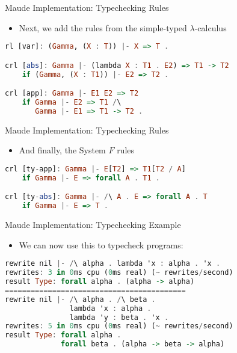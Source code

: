 \documentclass[leqno,presentation,usenames,dvipsnames]{beamer}
\begin{document}
\begin{frame}[fragile]{Maude Implementation: Typechecking Rules}
    \begin{itemize}
        \item Next, we add the rules from the simple-typed $\lambda$-calculus
    \end{itemize}

\begin{lstlisting}[language=haskell, basicstyle=\small\ttfamily]
rl [var]: (Gamma, (X : T)) |- X => T .

crl [abs]: Gamma |- (lambda X : T1 . E2) => T1 -> T2
    if (Gamma, (X : T1)) |- E2 => T2 .

crl [app]: Gamma |- E1 E2 => T2
    if Gamma |- E2 => T1 /\
       Gamma |- E1 => T1 -> T2 .
\end{lstlisting}
\end{frame}

\begin{frame}[fragile]{Maude Implementation: Typechecking Rules}
    \begin{itemize}
        \item And finally, the System $F$ rules
    \end{itemize}

\begin{lstlisting}[language=haskell, basicstyle=\small\ttfamily]
crl [ty-app]: Gamma |- E[T2] => T1[T2 / A]
    if Gamma |- E => forall A . T1 .

crl [ty-abs]: Gamma |- /\ A . E => forall A . T
    if Gamma |- E => T .
\end{lstlisting}
\end{frame}

\begin{frame}[fragile]{Maude Implementation: Typechecking Example}
    \begin{itemize}
        \item We can now use this to typecheck programs:
    \end{itemize}

\footnotesize
\begin{lstlisting}[language=haskell, basicstyle=\small\ttfamily]
rewrite nil |- /\ alpha . lambda 'x : alpha . 'x .
rewrites: 3 in 0ms cpu (0ms real) (~ rewrites/second)
result Type: forall alpha . (alpha -> alpha)
==========================================
rewrite nil |- /\ alpha . /\ beta .
               lambda 'x : alpha .
               lambda 'y : beta . 'x .
rewrites: 5 in 0ms cpu (0ms real) (~ rewrites/second)
result Type: forall alpha .
             forall beta . (alpha -> beta -> alpha)
\end{lstlisting}
\end{frame}
\end{document}
